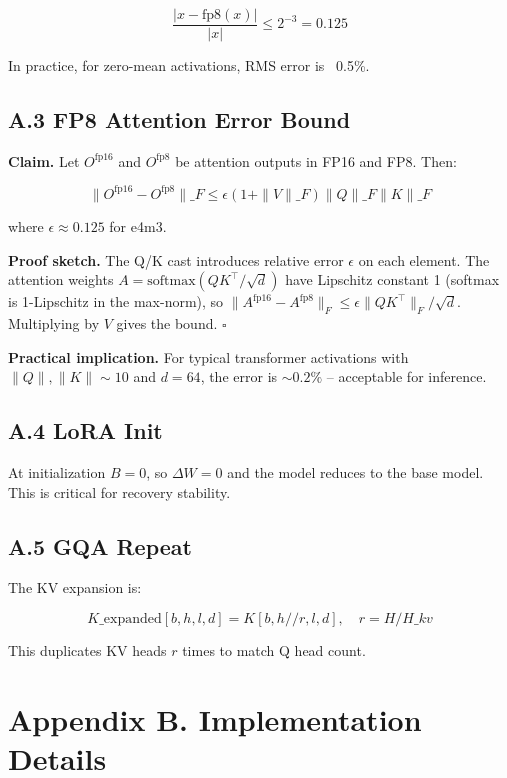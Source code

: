 \[
\frac{|x - \text{fp8}(x)|}{|x|} \leq 2^{-3} = 0.125
\tag{A.3}
\]

In practice, for zero-mean activations, RMS error is ~0.5\%.

\subsection{A.3 FP8 Attention Error Bound}

\textbf{Claim.} Let $O^\text{fp16}$ and $O^\text{fp8}$ be attention outputs in 
FP16 and FP8. Then:

\[
\|O^\text{fp16} - O^\text{fp8}\|\_F \leq \epsilon (1 + \|V\|\_F) \|Q\|\_F \|K\|\_F
\tag{A.4}
\]

where $\epsilon \approx 0.125$ for e4m3.

\textbf{Proof sketch.} The Q/K cast introduces relative error $\epsilon$ on each 
element. The attention weights $A = \text{softmax}(QK^\top/\sqrt{d})$ have 
Lipschitz constant 1 (softmax is 1-Lipschitz in the max-norm), so 
$\|A^\text{fp16} - A^\text{fp8}\|_F \leq \epsilon \|QK^\top\|_F / \sqrt{d}$. 
Multiplying by $V$ gives the bound. $\square$

\textbf{Practical implication.} For typical transformer activations with 
$\|Q\|, \|K\| \sim 10$ and $d = 64$, the error is $\sim 0.2\%$ -- acceptable 
for inference.

\subsection{A.4 LoRA Init}

At initialization $B = 0$, so $\Delta W = 0$ and the model reduces to the 
base model. This is critical for recovery stability.

\subsection{A.5 GQA Repeat}

The KV expansion is:

\[
K\_\text{expanded}[b, h, l, d] = K[b, h // r, l, d], \quad r = H / H\_{kv}
\tag{A.5}
\]

This duplicates KV heads $r$ times to match Q head count.




\section{Appendix B. Implementation Details}

